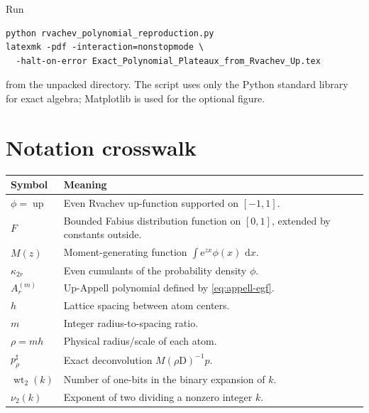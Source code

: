 \documentclass[11pt,oneside]{article}
\theoremstyle{definition}
\theoremstyle{remark}
\newcommand{\Up}{\operatorname{up}}
\newcommand{\wt}{\operatorname{wt}_2}
\newcommand{\vtwo}{\nu_2}
\newcommand{\dd}{\,\mathrm d}
\newcommand{\e}{\mathrm e}
\newcommand{\D}{\mathrm D}
\begin{document}
Run
\begin{lstlisting}[style=pseudo]
python rvachev_polynomial_reproduction.py
latexmk -pdf -interaction=nonstopmode \
  -halt-on-error Exact_Polynomial_Plateaux_from_Rvachev_Up.tex
\end{lstlisting}
from the unpacked directory.  The script uses only the Python standard library
for exact algebra; Matplotlib is used for the optional figure.

\section{Notation crosswalk}
\label{app:notation}

\begin{center}
\begin{tabularx}{\textwidth}{@{}lX@{}}
\toprule
Symbol & Meaning\\
\midrule
\(\phi=\Up\) & Even Rvachev up-function supported on \([-1,1]\).\\
\(F\) & Bounded Fabius distribution function on \([0,1]\), extended by
constants outside.\\
\(M(z)\) & Moment-generating function \(\int\e^{zx}\phi(x)\,\dd x\).\\
\(\kappa_{2r}\) & Even cumulants of the probability density \(\phi\).\\
\(A_r^{(m)}\) & Up-Appell polynomial defined by \eqref{eq:appell-egf}.\\
\(h\) & Lattice spacing between atom centers.\\
\(m\) & Integer radius-to-spacing ratio.\\
\(\rho=mh\) & Physical radius/scale of each atom.\\
\(p_\rho^\sharp\) & Exact deconvolution \(M(\rho\D)^{-1}p\).\\
\(\wt(k)\) & Number of one-bits in the binary expansion of \(k\).\\
\(\vtwo(k)\) & Exponent of two dividing a nonzero integer \(k\).\\
\bottomrule
\end{tabularx}
\end{center}
\end{document}

